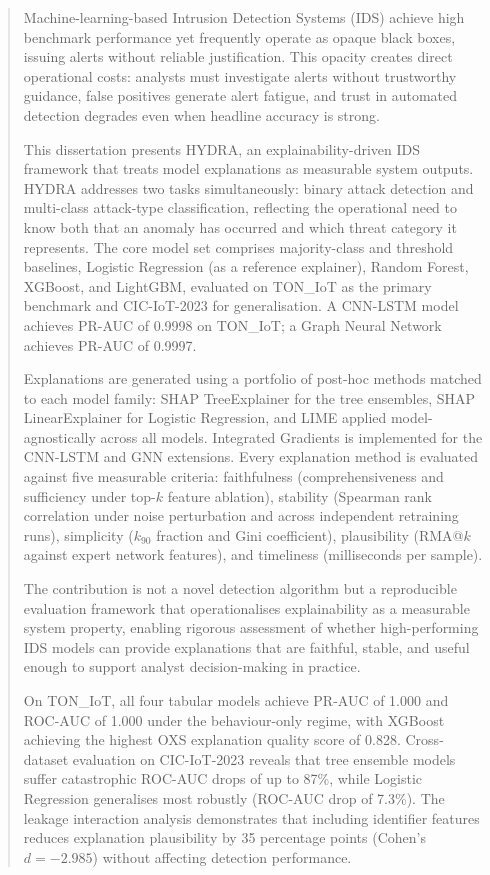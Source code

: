 \documentclass[12pt,a4paper]{report}
\begin{document}
\newpage
\begin{abstract}
Machine-learning-based Intrusion Detection Systems (IDS) achieve high benchmark performance yet frequently operate as opaque black boxes, issuing alerts without reliable justification. This opacity creates direct operational costs: analysts must investigate alerts without trustworthy guidance, false positives generate alert fatigue, and trust in automated detection degrades even when headline accuracy is strong.

This dissertation presents HYDRA, an explainability-driven IDS framework that treats model explanations as measurable system outputs. HYDRA addresses two tasks simultaneously: binary attack detection and multi-class attack-type classification, reflecting the operational need to know both that an anomaly has occurred and which threat category it represents. The core model set comprises majority-class and threshold baselines, Logistic Regression (as a reference explainer), Random Forest, XGBoost, and LightGBM, evaluated on TON\_IoT as the primary benchmark and CIC-IoT-2023 for generalisation. A CNN-LSTM model achieves PR-AUC of 0.9998 on TON\_IoT; a Graph Neural Network achieves PR-AUC of 0.9997.

Explanations are generated using a portfolio of post-hoc methods matched to each model family: SHAP TreeExplainer for the tree ensembles, SHAP LinearExplainer for Logistic Regression, and LIME applied model-agnostically across all models. Integrated Gradients is implemented for the CNN-LSTM and GNN extensions. Every explanation method is evaluated against five measurable criteria: faithfulness (comprehensiveness and sufficiency under top-$k$ feature ablation), stability (Spearman rank correlation under noise perturbation and across independent retraining runs), simplicity ($k_{90}$ fraction and Gini coefficient), plausibility (RMA@$k$ against expert network features), and timeliness (milliseconds per sample).

The contribution is not a novel detection algorithm but a reproducible evaluation framework that operationalises explainability as a measurable system property, enabling rigorous assessment of whether high-performing IDS models can provide explanations that are faithful, stable, and useful enough to support analyst decision-making in practice.

On TON\_IoT, all four tabular models achieve PR-AUC of 1.000 and ROC-AUC of 1.000 under the behaviour-only regime, with XGBoost achieving the highest OXS explanation quality score of 0.828. Cross-dataset evaluation on CIC-IoT-2023 reveals that tree ensemble models suffer catastrophic ROC-AUC drops of up to 87\%, while Logistic Regression generalises most robustly (ROC-AUC drop of 7.3\%). The leakage interaction analysis demonstrates that including identifier features reduces explanation plausibility by 35 percentage points (Cohen's $d = -2.985$) without affecting detection performance.
\end{abstract}
\end{document}
